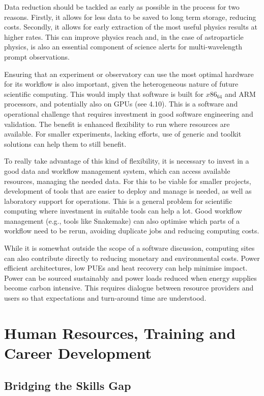 Data reduction should be tackled as early as possible in the process for two reasons. Firstly, it allows for less data to be saved to long term storage, reducing costs. Secondly, it allows for early extraction of the most useful physics results at higher rates. This can improve physics reach and, in the case of astroparticle physics, is also an essential component of science alerts for multi-wavelength prompt observations.

Ensuring that an experiment or observatory can use the most optimal hardware for its workflow is also important, given the heterogeneous nature of future scientific computing. This would imply that software is built for $x86_64$ and ARM processors, and potentially also on GPUs (see 4.10). This is a software and operational challenge that requires investment in good software engineering and validation. The benefit is enhanced flexibility to run where resources are available. For smaller experiments, lacking efforts, use of generic and toolkit solutions can help them to still benefit.

To really take advantage of this kind of flexibility, it is necessary to invest in a good data and workflow management system, which can access available resources, managing the needed data. For this to be viable for smaller projects, development of tools that are easier to deploy and manage is needed, as well as laboratory support for operations. This is a general problem for scientific computing where investment in suitable tools can help a lot. Good workflow management (e.g., tools like Snakemake) can also optimise which parts of a workflow need to be rerun, avoiding duplicate jobs and reducing computing costs.

While it is somewhat outside the scope of a software discussion, computing sites can also contribute directly to reducing monetary and environmental costs. Power efficient architectures, low PUEs and heat recovery can help minimise impact. Power can be sourced sustainably and power loads reduced when energy supplies become carbon intensive. This requires dialogue between resource providers and users so that expectations and turn-around time are understood.


\section{Human Resources, Training and Career Development}

\subsection{Bridging the Skills Gap}

